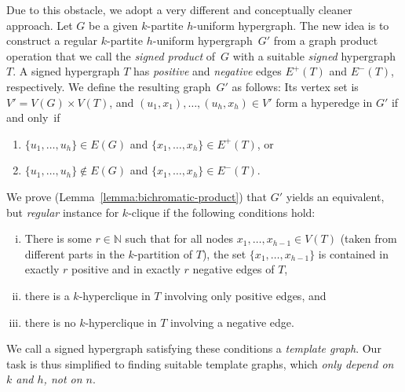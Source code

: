 \documentclass[a4paper,UKenglish,cleveref, autoref, thm-restate,numberwithinsect]{lipics-v2021}
\begin{document}
Due to this obstacle, we adopt a very different and conceptually cleaner approach. Let $G$ be a given $k$-partite $h$-uniform hypergraph. The new idea is to construct a regular $k$-partite $h$-uniform hypergraph~$G'$ from a graph product operation that we call the \emph{signed product} of~$G$ with a suitable \emph{signed} hypergraph $T$. A signed hypergraph $T$ has \emph{positive} and \emph{negative} edges $E^+(T)$ and $E^-(T)$, respectively. We define the resulting graph~$G'$ as follows: Its vertex set is $V'= V(G)\times V(T)$, and $(u_1, x_1), \dots, (u_h, x_h)\in V'$ form a hyperedge in $G'$ if and only~if
\smallskip
\begin{enumerate}
\item $\{u_1,\dots,u_h\}\in E(G)$ and $\{x_1,\dots, x_h\}\in E^+(T)$, or
\item $\{u_1,\dots, u_h\} \notin E(G)$ and $\{x_1,\dots, x_h\}\in E^-(T)$.
\end{enumerate}
\smallskip
We prove (Lemma~\ref{lemma:bichromatic-product}) that $G'$ yields an equivalent, but \emph{regular} instance for $k$-clique if the following conditions hold:
\smallskip
\begin{enumerate}[(i)]
    \item There is some $r \in \mathbb{N}$ such that for all nodes $x_1, \dots, x_{h-1} \in V(T)$ (taken from different parts in the $k$-partition of $T$), the set $\{x_1,\dots, x_{h-1}\}$ is contained in exactly $r$ positive and in exactly $r$ negative edges of $T$, 
    \item there is a $k$-hyperclique in $T$ involving only positive edges, and
    \item there is no $k$-hyperclique in $T$ involving a negative edge.
\end{enumerate}
\smallskip
We call a signed hypergraph satisfying these conditions a \emph{template graph}.
Our task is thus simplified to finding suitable template graphs, which \emph{only depend on $k$ and $h$, not on $n$}.
\end{document}
